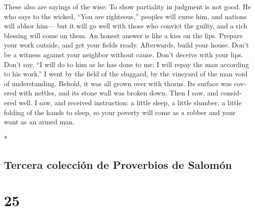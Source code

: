 \begin{paracol}{2}
\begin{otherlanguage}{english}
 These also are sayings of the wise: To show partiality
in judgment is not good.  He who says to the wicked,
``You are righteous,'' peoples will curse him, and nations will abhor
him---  but it will go well with those who convict the
guilty, and a rich blessing will come on them.  An honest
answer is like a kiss on the lips.  Prepare your work
outside, and get your fields ready. Afterwards, build your house.
 Don't be a witness against your neighbor without cause.
Don't deceive with your lips.  Don't say, ``I will do to
him as he has done to me; I will repay the man according to his work.''
 I went by the field of the sluggard, by the vineyard of
the man void of understanding.  Behold, it was all grown
over with thorns. Its surface was covered with nettles, and its stone
wall was broken down.  Then I saw, and considered well. I
saw, and received instruction:  a little sleep, a little
slumber, a little folding of the hands to sleep,  so your
poverty will come as a robber and your want as an armed man.

\end{otherlanguage}

\switchcolumn[0]*

\hypertarget{tercera-colecciuxf3n-de-proverbios-de-salomuxf3n}{%
\subsection{Tercera colección de Proverbios de
Salomón}\label{tercera-colecciuxf3n-de-proverbios-de-salomuxf3n}}

\hypertarget{section-48}{%
\section{25}\label{section-48}}


\end{paracol}
